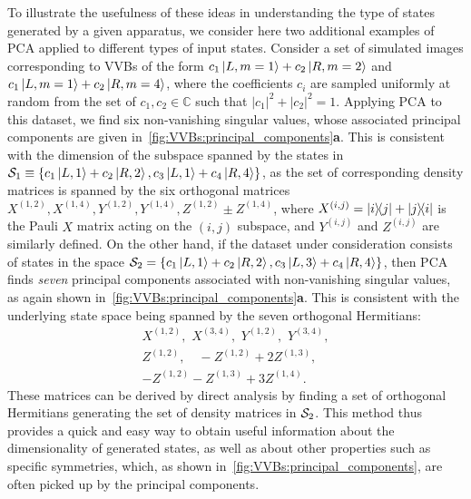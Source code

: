 To illustrate the usefulness of these ideas in understanding the type of states generated by a given apparatus, we consider here two additional examples of \ac{PCA} applied to different types of input states. 
Consider a set of simulated images corresponding to VVBs of the form
$c_1\ket{L,m=1}+c_2\ket{R,m=2}$ and
$c_1\ket{L,m=1}+c_2\ket{R,m=4}$, where the coefficients $c_i$ are sampled uniformly at random from the set of $c_{1},c_2\in\mathbb{C}$  such that $|c_1|^2+|c_2|^2=1$.
Applying PCA to this dataset, we find six non-vanishing singular values, whose associated principal components are given in~\cref{fig:VVBs:principal_components}\textbf{a}.
This is consistent with the dimension of the subspace  spanned by the states in ${\mathcal{S}}_1\equiv\{c_1\ket{L,1}+c_2\ket{R,2}, c_3\ket{L,1}+c_4\ket{R,4}\}$,  as the set of corresponding density matrices is spanned by the six orthogonal matrices
$X^{(1,2)}, X^{(1,4)}, Y^{(1,2)},Y^{(1,4)},Z^{(1,2)}\pm Z^{(1,4)}$, where $X^{(i,j)}=\ketbra{i}{j}+\ketbra{j}{i}$ is the Pauli $X$ matrix acting on the $(i,j)$ subspace, and $Y^{(i,j)}$ and $Z^{(i,j)}$ are similarly defined.
On the other hand, if the dataset under consideration consists of states in the space $\mathcal S_2=\{c_1\ket{L,1}+c_2\ket{R,2}, c_3\ket{L,3}+c_4\ket{R,4}\}$, then \ac{PCA} finds \emph{seven} principal components associated with non-vanishing singular values, as again shown in~\cref{fig:VVBs:principal_components}\textbf{a}.
This is consistent with the underlying state space being spanned by the seven orthogonal Hermitians:
\begin{equation}
\begin{gathered}
    X^{(1,2)}, \,\, X^{(3,4)}, \,\,
    Y^{(1,2)}, \,\, Y^{(3,4)}, \\
    Z^{(1,2)},\quad
    -Z^{(1,2)} + 2 Z^{(1,3)}, \\
    -Z^{(1,2)} - Z^{(1,3)} + 3 Z^{(1,4)}.
\end{gathered}
\end{equation}
These matrices can be derived by direct analysis by finding a set of orthogonal Hermitians generating the set of density matrices in ${\mathcal{S}}_2$.
This method thus provides a quick and easy way to obtain useful information about the dimensionality of generated states, as well as about other properties such as specific symmetries, which, as shown in~\cref{fig:VVBs:principal_components}, are often picked up by the principal components.


